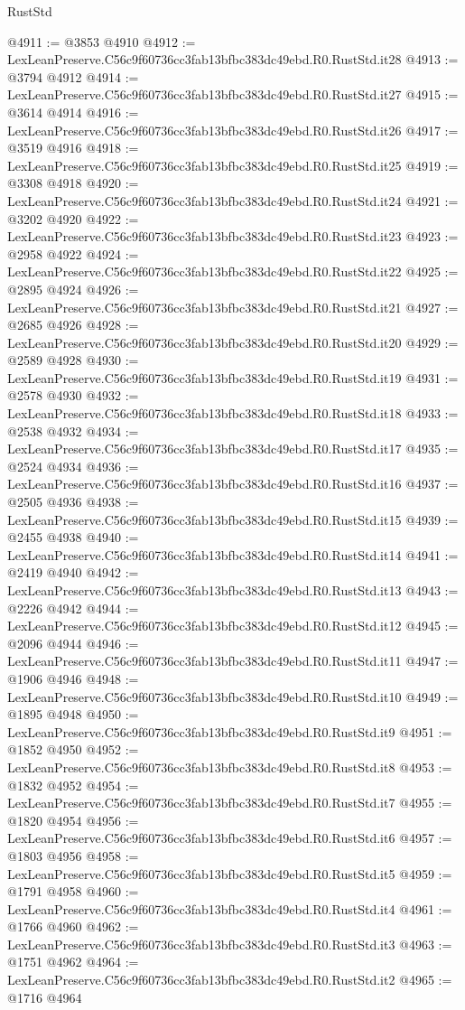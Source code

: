 \begin{lexlean}{RustStd}
\begin{coremodule}
@4911 := @3853 @4910
@4912 := LexLeanPreserve.C56c9f60736cc3fab13bfbc383dc49ebd.R0.RustStd.it28
@4913 := @3794 @4912
@4914 := LexLeanPreserve.C56c9f60736cc3fab13bfbc383dc49ebd.R0.RustStd.it27
@4915 := @3614 @4914
@4916 := LexLeanPreserve.C56c9f60736cc3fab13bfbc383dc49ebd.R0.RustStd.it26
@4917 := @3519 @4916
@4918 := LexLeanPreserve.C56c9f60736cc3fab13bfbc383dc49ebd.R0.RustStd.it25
@4919 := @3308 @4918
@4920 := LexLeanPreserve.C56c9f60736cc3fab13bfbc383dc49ebd.R0.RustStd.it24
@4921 := @3202 @4920
@4922 := LexLeanPreserve.C56c9f60736cc3fab13bfbc383dc49ebd.R0.RustStd.it23
@4923 := @2958 @4922
@4924 := LexLeanPreserve.C56c9f60736cc3fab13bfbc383dc49ebd.R0.RustStd.it22
@4925 := @2895 @4924
@4926 := LexLeanPreserve.C56c9f60736cc3fab13bfbc383dc49ebd.R0.RustStd.it21
@4927 := @2685 @4926
@4928 := LexLeanPreserve.C56c9f60736cc3fab13bfbc383dc49ebd.R0.RustStd.it20
@4929 := @2589 @4928
@4930 := LexLeanPreserve.C56c9f60736cc3fab13bfbc383dc49ebd.R0.RustStd.it19
@4931 := @2578 @4930
@4932 := LexLeanPreserve.C56c9f60736cc3fab13bfbc383dc49ebd.R0.RustStd.it18
@4933 := @2538 @4932
@4934 := LexLeanPreserve.C56c9f60736cc3fab13bfbc383dc49ebd.R0.RustStd.it17
@4935 := @2524 @4934
@4936 := LexLeanPreserve.C56c9f60736cc3fab13bfbc383dc49ebd.R0.RustStd.it16
@4937 := @2505 @4936
@4938 := LexLeanPreserve.C56c9f60736cc3fab13bfbc383dc49ebd.R0.RustStd.it15
@4939 := @2455 @4938
@4940 := LexLeanPreserve.C56c9f60736cc3fab13bfbc383dc49ebd.R0.RustStd.it14
@4941 := @2419 @4940
@4942 := LexLeanPreserve.C56c9f60736cc3fab13bfbc383dc49ebd.R0.RustStd.it13
@4943 := @2226 @4942
@4944 := LexLeanPreserve.C56c9f60736cc3fab13bfbc383dc49ebd.R0.RustStd.it12
@4945 := @2096 @4944
@4946 := LexLeanPreserve.C56c9f60736cc3fab13bfbc383dc49ebd.R0.RustStd.it11
@4947 := @1906 @4946
@4948 := LexLeanPreserve.C56c9f60736cc3fab13bfbc383dc49ebd.R0.RustStd.it10
@4949 := @1895 @4948
@4950 := LexLeanPreserve.C56c9f60736cc3fab13bfbc383dc49ebd.R0.RustStd.it9
@4951 := @1852 @4950
@4952 := LexLeanPreserve.C56c9f60736cc3fab13bfbc383dc49ebd.R0.RustStd.it8
@4953 := @1832 @4952
@4954 := LexLeanPreserve.C56c9f60736cc3fab13bfbc383dc49ebd.R0.RustStd.it7
@4955 := @1820 @4954
@4956 := LexLeanPreserve.C56c9f60736cc3fab13bfbc383dc49ebd.R0.RustStd.it6
@4957 := @1803 @4956
@4958 := LexLeanPreserve.C56c9f60736cc3fab13bfbc383dc49ebd.R0.RustStd.it5
@4959 := @1791 @4958
@4960 := LexLeanPreserve.C56c9f60736cc3fab13bfbc383dc49ebd.R0.RustStd.it4
@4961 := @1766 @4960
@4962 := LexLeanPreserve.C56c9f60736cc3fab13bfbc383dc49ebd.R0.RustStd.it3
@4963 := @1751 @4962
@4964 := LexLeanPreserve.C56c9f60736cc3fab13bfbc383dc49ebd.R0.RustStd.it2
@4965 := @1716 @4964

\end{coremodule}
\end{lexlean}
